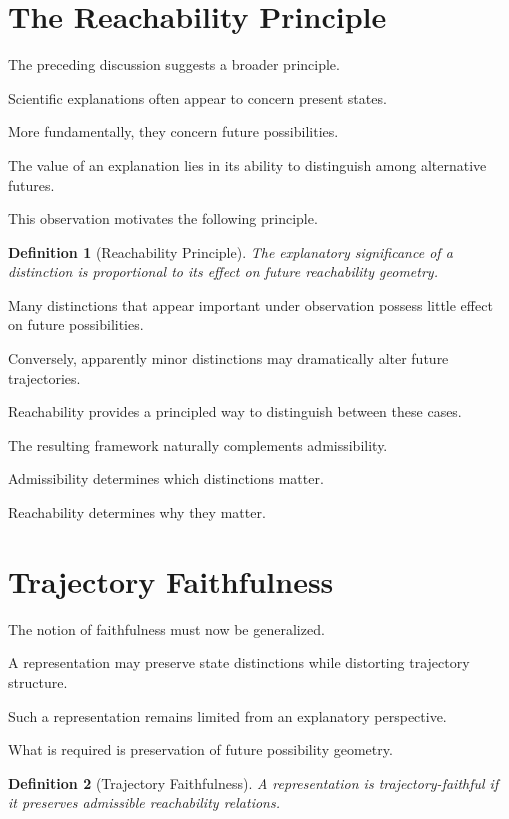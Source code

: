 \documentclass[11pt,oneside,openany]{book}
\newtheorem{definition}{Definition}[chapter] \newtheorem{theorem}{Theorem}[chapter] \newtheorem{proposition}{Proposition}[chapter] \newtheorem{lemma}{Lemma}[chapter] \newtheorem{corollary}{Corollary}[chapter] \newtheorem{remark}{Remark}[chapter]
\begin{document}
\section{The Reachability Principle}

The preceding discussion suggests a broader principle.

Scientific explanations often appear to concern present states.

More fundamentally, they concern future possibilities.

The value of an explanation lies in its ability to distinguish among alternative futures.

This observation motivates the following principle.

\begin{definition}[Reachability Principle]

The explanatory significance of a distinction is proportional to its effect on future reachability geometry.

\end{definition}

Many distinctions that appear important under observation possess little effect on future possibilities.

Conversely, apparently minor distinctions may dramatically alter future trajectories.

Reachability provides a principled way to distinguish between these cases.

The resulting framework naturally complements admissibility.

Admissibility determines which distinctions matter.

Reachability determines why they matter.

\section{Trajectory Faithfulness}

The notion of faithfulness must now be generalized.

A representation may preserve state distinctions while distorting trajectory structure.

Such a representation remains limited from an explanatory perspective.

What is required is preservation of future possibility geometry.

\begin{definition}[Trajectory Faithfulness]

A representation is trajectory-faithful if it preserves admissible reachability relations.

\end{definition}
\end{document}
